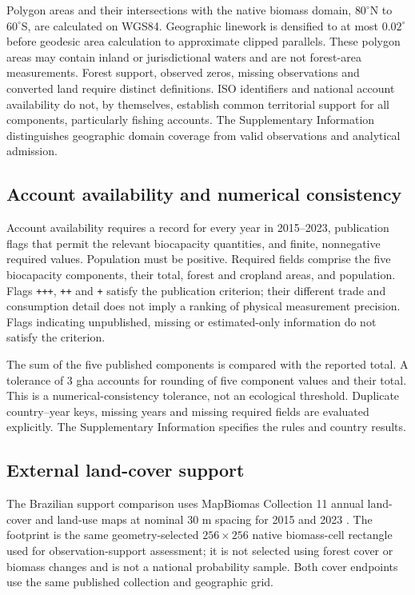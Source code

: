 \documentclass[11pt,a4paper]{article}
\begin{document}
Polygon areas and their intersections with the native biomass domain, $80^\circ$N to $60^\circ$S, are calculated on WGS84. Geographic linework is densified to at most $0.02^\circ$ before geodesic area calculation to approximate clipped parallels. These polygon areas may contain inland or jurisdictional waters and are not forest-area measurements. Forest support, observed zeros, missing observations and converted land require distinct definitions. ISO identifiers and national account availability do not, by themselves, establish common territorial support for all components, particularly fishing accounts. The Supplementary Information distinguishes geographic domain coverage from valid observations and analytical admission.

\subsection{Account availability and numerical consistency}
Account availability requires a record for every year in 2015--2023, publication flags that permit the relevant biocapacity quantities, and finite, nonnegative required values. Population must be positive. Required fields comprise the five biocapacity components, their total, forest and cropland areas, and population. Flags \texttt{+++}, \texttt{++} and \texttt{+} satisfy the publication criterion; their different trade and consumption detail does not imply a ranking of physical measurement precision. Flags indicating unpublished, missing or estimated-only information do not satisfy the criterion.

The sum of the five published components is compared with the reported total. A tolerance of 3 gha accounts for rounding of five component values and their total. This is a numerical-consistency tolerance, not an ecological threshold. Duplicate country--year keys, missing years and missing required fields are evaluated explicitly. The Supplementary Information specifies the rules and country results.



\subsection{External land-cover support}
The Brazilian support comparison uses MapBiomas Collection 11 annual land-cover and land-use maps at nominal 30 m spacing for 2015 and 2023 \citep{MapBiomas2026}. The footprint is the same geometry-selected $256\times256$ native biomass-cell rectangle used for observation-support assessment; it is not selected using forest cover or biomass changes and is not a national probability sample. Both cover endpoints use the same published collection and geographic grid.
\end{document}
